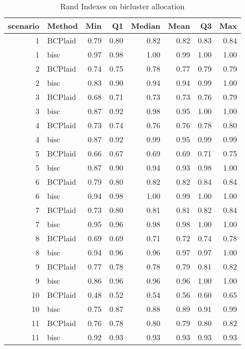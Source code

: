\begin{table}[ht]
\caption{Rand Indexes on bicluster allocation}
\vspace{1.5cm}
\centering
\begin{tabular}{rlrrrrrr}
  \toprule
scenario & Method & Min & Q1 & Median & Mean & Q3 & Max \\ 
  \midrule
  1 & BCPlaid & 0.79 & 0.80 & 0.82 & 0.82 & 0.83 & 0.84 \\ 
    1 & bisc & 0.97 & 0.98 & 1.00 & 0.99 & 1.00 & 1.00 \\ 
    2 & BCPlaid & 0.74 & 0.75 & 0.78 & 0.77 & 0.79 & 0.79 \\ 
    2 & bisc & 0.83 & 0.90 & 0.94 & 0.94 & 0.99 & 1.00 \\ 
    3 & BCPlaid & 0.68 & 0.71 & 0.73 & 0.73 & 0.76 & 0.79 \\ 
    3 & bisc & 0.87 & 0.92 & 0.98 & 0.95 & 1.00 & 1.00 \\ 
    4 & BCPlaid & 0.73 & 0.74 & 0.76 & 0.76 & 0.78 & 0.80 \\ 
    4 & bisc & 0.87 & 0.92 & 0.99 & 0.95 & 0.99 & 0.99 \\ 
    5 & BCPlaid & 0.66 & 0.67 & 0.69 & 0.69 & 0.71 & 0.75 \\ 
    5 & bisc & 0.87 & 0.90 & 0.94 & 0.93 & 0.98 & 1.00 \\ 
    6 & BCPlaid & 0.79 & 0.80 & 0.82 & 0.82 & 0.84 & 0.84 \\ 
    6 & bisc & 0.94 & 0.98 & 1.00 & 0.99 & 1.00 & 1.00 \\ 
    7 & BCPlaid & 0.73 & 0.80 & 0.81 & 0.81 & 0.82 & 0.84 \\ 
    7 & bisc & 0.95 & 0.96 & 0.98 & 0.98 & 1.00 & 1.00 \\ 
    8 & BCPlaid & 0.69 & 0.69 & 0.71 & 0.72 & 0.74 & 0.78 \\ 
    8 & bisc & 0.94 & 0.96 & 0.96 & 0.97 & 0.97 & 1.00 \\ 
    9 & BCPlaid & 0.77 & 0.78 & 0.78 & 0.79 & 0.81 & 0.82 \\ 
    9 & bisc & 0.86 & 0.96 & 0.96 & 0.96 & 1.00 & 1.00 \\ 
   10 & BCPlaid & 0.48 & 0.52 & 0.54 & 0.56 & 0.60 & 0.65 \\ 
   10 & bisc & 0.75 & 0.87 & 0.88 & 0.89 & 0.91 & 0.99 \\ 
   11 & BCPlaid & 0.76 & 0.78 & 0.80 & 0.79 & 0.80 & 0.82 \\ 
   11 & bisc & 0.92 & 0.93 & 0.93 & 0.93 & 0.93 & 0.93 \\ 

\end{tabular}
\end{table}
